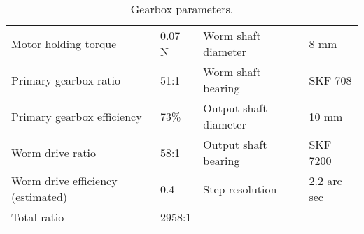 
\begin{center}
\begin{table}[H]
\begin{tabular}{ll|ll}
Motor holding torque              & 0.07 N & Worm shaft diameter   & 8 mm         \\
Primary gearbox ratio             & 51:1   & Worm shaft bearing    & SKF 708      \\
Primary gearbox efficiency        & 73\%   & Output shaft diameter & 10 mm        \\
Worm drive ratio                  & 58:1   & Output shaft bearing  & SKF 7200  \\
Worm drive efficiency (estimated) & 0.4    & Step resolution       & 2.2 arc sec  \\
Total ratio                       & 2958:1 &                       &             
\end{tabular}
\caption{Gearbox parameters.}
\end{table}
\label{tab:mechanical-gearbox}
\end{center}